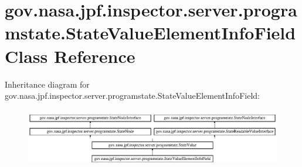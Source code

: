\hypertarget{classgov_1_1nasa_1_1jpf_1_1inspector_1_1server_1_1programstate_1_1_state_value_element_info_field}{}\section{gov.\+nasa.\+jpf.\+inspector.\+server.\+programstate.\+State\+Value\+Element\+Info\+Field Class Reference}
\label{classgov_1_1nasa_1_1jpf_1_1inspector_1_1server_1_1programstate_1_1_state_value_element_info_field}
Inheritance diagram for gov.\+nasa.\+jpf.\+inspector.\+server.\+programstate.\+State\+Value\+Element\+Info\+Field\+:\begin{figure}[H]
\begin{center}
\leavevmode
\includegraphics[height=2.592592cm]{classgov_1_1nasa_1_1jpf_1_1inspector_1_1server_1_1programstate_1_1_state_value_element_info_field}
\end{center}
\end{figure}
